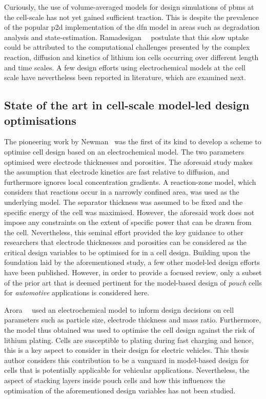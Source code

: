 Curiously,  the  use  of  volume-averaged   models  for  design  simulations  of
\glspl{pbm}  at the  cell-scale has  not  yet gained  sufficient traction.  This
is  despite  the prevalence  of  the  popular  \gls{p2d} implementation  of  the
\gls{dfn}  model in  areas such  as degradation  analysis and  state-estimation.
Ramadesigan~\etal~\cite{Ramadesigan2012} postulate  that this slow  uptake could
be attributed to the computational challenges presented by the complex reaction,
diffusion and kinetics of lithium ion  cells occurring over different length and
time scales. A few design efforts using electrochemical models at the cell scale
have nevertheless been reported in literature, which are examined next.

\subsection{State of the art in cell-scale model-led design optimisations}

The  pioneering work  by  Newman~\cite{Newman1995}  was the  first  of its  kind
to  develop  a scheme  to  optimise  cell  design  based on  an  electrochemical
model. The two  parameters optimised were electrode  thicknesses and porosities.
The  aforesaid study  makes  the  assumption that  electrode  kinetics are  fast
relative to diffusion, and furthermore  ignores local concentration gradients. A
reaction-zone model, which considers that reactions occur in a narrowly confined
area, was used  as the underlying model. The separator  thickness was assumed to
be  fixed and  the  specific energy  of  the cell  was  maximised. However,  the
aforesaid work does  not impose any constraints on the  extent of specific power
that can be drawn from the  cell. Nevertheless, this seminal effort provided the
key guidance to other researchers  that electrode thicknesses and porosities can
be considered  as the critical  design variables to be  optimised for in  a cell
design. Building  upon the foundation  laid by  the aforementioned study,  a few
other model-led design efforts have been published. However, in order to provide
a focused review,  only a subset of  the prior art that is  deemed pertinent for
the model-based design of  \emph{pouch} cells for \emph{automotive} applications
is considered here.

Arora~\etal~\cite{Arora1999}  used an  electrochemical  model  to inform  design
decisions on cell parameters such as particle size, electrode thickness and mass
ratio. Furthermore, the model thus obtained was used to optimise the cell design
against the  risk of lithium  plating. Cells  are susceptible to  plating during
fast charging and  hence, this is a  key aspect to consider in  their design for
electric  vehicles. This  thesis  author  considers this  contribution  to be  a
vanguard  in model-based  design for  cells that  is potentially  applicable for
vehicular applications. Nevertheless, the aspect of stacking layers inside pouch
cells  and how  this influences  the optimisation  of the  aforementioned design
variables has not been studied.


